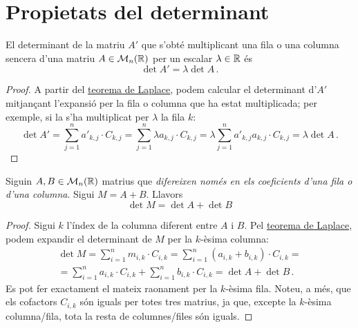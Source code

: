 \newpage
\section{Propietats del determinant}
\begin{prop}
	El determinant de la matriu $A'$ que s'obté multiplicant una fila o una columna sencera d'una matriu $A\in\mathcal{M}_n(\mathbb{R})$ per un escalar $\lambda\in\mathbb{R}$ és \[\det A' = \lambda\det A\,.\]
	\begin{proof}
		A partir del \hyperref[teo:laplace]{teorema de Laplace}, podem calcular el determinant d'$A'$ mitjançant l'expansió per la fila o columna que ha estat multiplicada; per exemple, si la s'ha multiplicat per $\lambda$ la fila $k$:
		\[\det A' = \sum_{j=1}^{n} {a'}_{k,j}\cdot C_{k,j} =\sum_{j=1}^{n} \lambda {a}_{k,j} \cdot C_{k,j} = \lambda \sum_{j=1}^{n} {a'}_{k,j} {a}_{k,j} \cdot C_{k,j} = \lambda\det A\,. \]
	\end{proof}
\end{prop}

\begin{prop}
	Siguin $A,B\in\mathcal{M}_{n}(\mathbb{R})$ matrius que \textit{difereixen només en els coeficients d'una fila o d'una columna}. Sigui $M=A+B$. Llavors \[\det M = \det A + \det B \]
	\begin{proof}
		Sigui $k$ l'índex de la columna diferent entre $A$ i $B$. Pel \hyperref[teo:laplace]{teorema de Laplace}, podem expandir el determinant de $M$ per la $k$-èsima columna:
		\begin{multline*}
			\det M = \sum_{i=1}^{n} {m}_{i,k}\cdot C_{i,k} = \sum_{i=1}^{n} ({a}_{i,k}+ {b}_{i,k})\cdot C_{i,k}=\\
			=\sum_{i=1}^{n}{a}_{i,k}\cdot C_{i,k} +\sum_{i=1}^{n} {b}_{i,k}\cdot C_{i,k}=\det A + \det B\,.
		\end{multline*}
		Es pot fer exactament el mateix raonament per la $k$-èsima fila. Noteu, a més, que els cofactors $C_{i,k}$ són iguals per totes tres matrius, ja que, excepte la $k$-èsima columna/fila, tota la resta de columnes/files són iguals.
	\end{proof}
\end{prop}